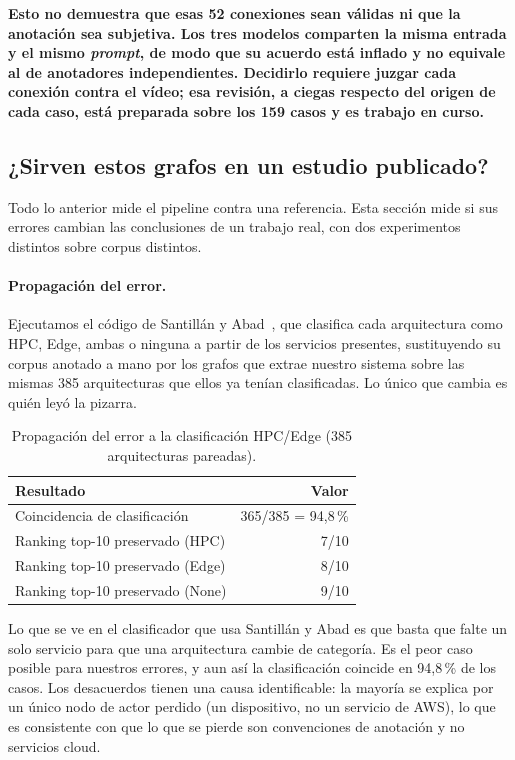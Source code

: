 \documentclass[a4paper, twocolumn, 10pt]{IEEEtran}
\newcommand{\nuevo}[1]{{\bfseries #1}}
\begin{document}
\nuevo{Esto no demuestra que esas 52 conexiones sean válidas ni que la anotación sea
subjetiva. Los tres modelos comparten la misma entrada y el mismo \emph{prompt}, de
modo que su acuerdo está inflado y no equivale al de anotadores independientes.
Decidirlo requiere juzgar cada conexión contra el vídeo; esa revisión, a ciegas
respecto del origen de cada caso, está preparada sobre los 159 casos y es trabajo en
curso.}

\subsection{¿Sirven estos grafos en un estudio publicado?}
\label{sec:downstream}

Todo lo anterior mide el pipeline contra una referencia. Esta sección
mide si sus errores cambian las conclusiones de un trabajo real, con dos
experimentos distintos sobre corpus distintos.

\paragraph{Propagación del error.} Ejecutamos el código de Santillán y
Abad~\cite{santillan2025hpc}, que clasifica cada arquitectura como
HPC, Edge, ambas o ninguna a partir de los servicios presentes,
sustituyendo su corpus anotado a mano por los grafos que extrae nuestro
sistema sobre las mismas 385 arquitecturas que ellos ya tenían
clasificadas. Lo único que cambia es quién leyó la pizarra.

\begin{table}[H]
\centering\small
\caption{Propagación del error a la clasificación HPC/Edge (385 arquitecturas pareadas).}
\label{tab:downstream}
\begin{tabular}{lr}
\toprule
Resultado & Valor\\
\midrule
Coincidencia de clasificación     & 365/385 = 94,8\,\%\\
Ranking top-10 preservado (HPC)   & 7/10\\
Ranking top-10 preservado (Edge)  & 8/10\\
Ranking top-10 preservado (None)  & 9/10\\
\bottomrule
\end{tabular}
\end{table}

Lo que se ve en el clasificador que usa Santillán y Abad es que basta que falte un solo servicio para que una arquitectura cambie de categoría. Es el peor caso posible para nuestros errores, y aun así la clasificación coincide en 94,8\,\% de los casos. Los desacuerdos tienen una causa identificable: la mayoría se explica por un único nodo de actor perdido (un dispositivo, no un servicio de AWS), lo que es consistente con que lo que se pierde son convenciones de anotación y no servicios cloud.
\end{document}
